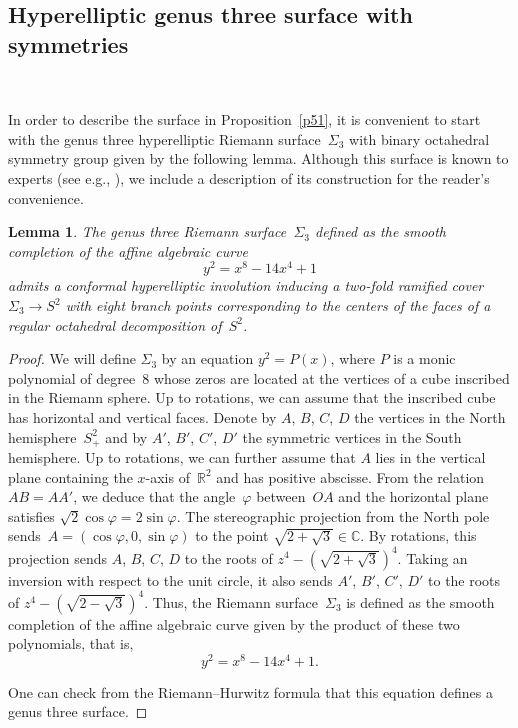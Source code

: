 \documentclass[12pt,reqno]{amsart}
\newtheorem{lemma}[theorem]{Lemma}
\theoremstyle{definition}
\numberwithin{equation}{section}
\newcommand\C {{\mathbb C}}
\newcommand\R {{\mathbb R}}
\numberwithin{equation}{section}
\begin{document}
\subsection{Hyperelliptic genus three surface with symmetries}

\mbox{ } \medskip

In order to describe the surface in Proposition~\ref{p51}, it is
convenient to start with the genus three hyperelliptic Riemann
surface~$\Sigma_3$ with binary octahedral symmetry group given by the
following lemma.  Although this surface is known to experts (see e.g.,
\cite{Ro97}), we include a description of its construction for the
reader's convenience.

\begin{lemma} \label{lem:Sigma3}
The genus three Riemann surface~$\Sigma_3$ defined as the smooth completion of the affine algebraic curve 
\[
y^2=x^8-14x^4+1
\]
admits a conformal hyperelliptic involution inducing a two-fold ramified cover $\Sigma_3 \to S^2$ with eight branch points corresponding to the centers of the faces of a regular octahedral decomposition of~$S^2$.
\end{lemma}


\begin{proof}
We will define $\Sigma_3$ by an equation $y^2=P(x)$, where $P$ is a monic polynomial of degree~$8$ whose zeros are located at the vertices of a cube inscribed in the Riemann sphere.
Up to rotations, we can assume that the inscribed cube has horizontal and vertical faces.
Denote by $A$, $B$, $C$, $D$ the vertices in the North hemisphere~$S^2_+$ and by $A'$, $B'$, $C'$, $D'$ the symmetric vertices in the South hemisphere.
Up to rotations, we can further assume that $A$ lies in the vertical plane containing the $x$-axis of~$\R^2$ and has positive abscisse.
From the relation $AB=AA'$, we deduce that the angle~$\varphi$ between~$OA$ and the horizontal plane satisfies $\sqrt{2} \cos \varphi = 2 \sin \varphi$.
The stereographic projection from the North pole sends~$A=(\cos \varphi,0,\sin \varphi)$ to the point $\sqrt{2+\sqrt{3}} \in \C$.
By rotations, this projection sends $A$, $B$, $C$, $D$ to the roots of $z^4 - (\sqrt{2+\sqrt{3}})^4$.
Taking an inversion with respect to the unit circle, it also sends $A'$, $B'$, $C'$, $D'$ to the roots of $z^4 - (\sqrt{2-\sqrt{3}})^4$.
Thus, the Riemann surface~$\Sigma_3$ is defined as the smooth completion of the affine algebraic curve given by the product of these two polynomials, that is,
\[
y^2=x^8-14x^4+1.
\]

One can check from the Riemann--Hurwitz formula that this equation defines a genus three surface.
\end{proof}
\end{document}
